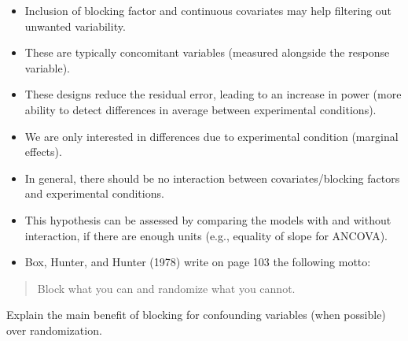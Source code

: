 \documentclass[
  11pt,
  letterpaper,
]{scrbook}
\providecommand{\tightlist}{%
  \setlength{\itemsep}{0pt}\setlength{\parskip}{0pt}}\usepackage{longtable,booktabs,array}
\theoremstyle{definition}
\theoremstyle{remark}
\begin{document}
\begin{tcolorbox}[enhanced jigsaw, colback=white, coltitle=black, rightrule=.15mm, left=2mm, bottomrule=.15mm, toprule=.15mm, titlerule=0mm, colframe=quarto-callout-important-color-frame, leftrule=.75mm, title=\textcolor{quarto-callout-important-color}{\faExclamation}\hspace{0.5em}{\textbf{Summary}}, breakable, arc=.35mm, colbacktitle=quarto-callout-important-color!10!white, opacitybacktitle=0.6, opacityback=0, toptitle=1mm, bottomtitle=1mm]

\begin{itemize}
\tightlist
\item
  Inclusion of blocking factor and continuous covariates may help
  filtering out unwanted variability.
\item
  These are typically concomitant variables (measured alongside the
  response variable).
\item
  These designs reduce the residual error, leading to an increase in
  power (more ability to detect differences in average between
  experimental conditions).
\item
  We are only interested in differences due to experimental condition
  (marginal effects).
\item
  In general, there should be no interaction between covariates/blocking
  factors and experimental conditions.
\item
  This hypothesis can be assessed by comparing the models with and
  without interaction, if there are enough units (e.g., equality of
  slope for ANCOVA).
\end{itemize}

\end{tcolorbox}

\begin{tcolorbox}[enhanced jigsaw, colback=white, coltitle=black, rightrule=.15mm, left=2mm, bottomrule=.15mm, toprule=.15mm, titlerule=0mm, colframe=quarto-callout-tip-color-frame, leftrule=.75mm, title=\textcolor{quarto-callout-tip-color}{\faLightbulb}\hspace{0.5em}{Your turn}, breakable, arc=.35mm, colbacktitle=quarto-callout-tip-color!10!white, opacitybacktitle=0.6, opacityback=0, toptitle=1mm, bottomtitle=1mm]

\begin{itemize}
\tightlist
\item
  Box, Hunter, and Hunter (1978) write on page 103 the following motto:
\end{itemize}

\begin{quote}
Block what you can and randomize what you cannot.
\end{quote}

Explain the main benefit of blocking for confounding variables (when
possible) over randomization.

\end{tcolorbox}
\end{document}

